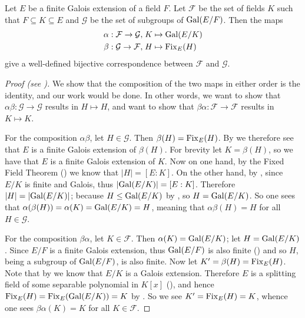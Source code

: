 \begin{theorem}\label{thrm-fundamental-theorem-of-galois-theory}
    Let $E$ be a finite Galois extension of a field $F$. Let $\mathcal{F}$ be the set of fields $K$ such that $F \subseteq K \subseteq E$ and $\mathcal{G}$ be the set of subgroups of $\mathrm{Gal}(E/F)$. Then the maps
    \begin{align*}
        \alpha: \mathcal{F} \to \mathcal{G}, \;&K \mapsto \mathrm{Gal}(E/K)\\
        \beta: \mathcal{G} \to \mathcal{F}, \;&H \mapsto \mathrm{Fix}_{E}(H)
    \end{align*}
    give a well-defined bijective correspondence between $\mathcal{F}$ and $\mathcal{G}$.
\end{theorem}
\begin{proof}[Proof (see {\cite[Theorem 16.7.1]{artin_2011}})]
    We show that the composition of the two maps in either order is the identity, and our work would be done. In other words, we want to show that $\alpha\beta: \mathcal{G} \to \mathcal{G}$ results in $H \mapsto H$, and want to show that $\beta\alpha: \mathcal{F} \to \mathcal{F}$ results in $K \mapsto K$.

    For the composition $\alpha\beta$, let $H \in \mathcal{G}$. Then $\beta(H) = \mathrm{Fix}_{E}(H)$. By  we therefore see that $E$ is a finite Galois extension of $\beta(H)$. For brevity let $K = \beta(H)$, so we have that $E$ is a finite Galois extension of $K$. Now on one hand, by the Fixed Field Theorem () we know that $|H| = [E:K]$. On the other hand, by , since $E/K$ is finite and Galois, thus $|\mathrm{Gal}(E/K)| = [E:K]$. Therefore $|H| = |\mathrm{Gal}(E/K)|$; because $H \leq \mathrm{Gal}(E/K)$ by , so $H = \mathrm{Gal}(E/K)$. So one sees that $\alpha(\beta(H)) = \alpha(K) = \mathrm{Gal}(E/K) = H$, meaning that $\alpha\beta(H) = H$ for all $H \in \mathcal{G}$.

    For the composition $\beta\alpha$, let $K \in \mathcal{F}$. Then $\alpha(K) = \mathrm{Gal}(E/K)$; let $H = \mathrm{Gal}(E/K)$. Since $E/F$ is a finite Galois extension, thus $\mathrm{Gal}(E/F)$ is also finite () and so $H$, being a subgroup of $\mathrm{Gal}(E/F)$, is also finite. Now let $K' = \beta(H) = \mathrm{Fix}_{E}(H)$. Note that by  we know that $E/K$ is a Galois extension. Therefore $E$ is a splitting field of some separable polynomial in $K[x]$ (), and hence $\mathrm{Fix}_{E}(H) = \mathrm{Fix}_{E}(\mathrm{Gal}(E/K)) = K$ by . So we see $K' = \mathrm{Fix}_{E}(H) = K$, whence one sees $\beta\alpha(K) = K$ for all $K \in \mathcal{F}$.
\end{proof}

